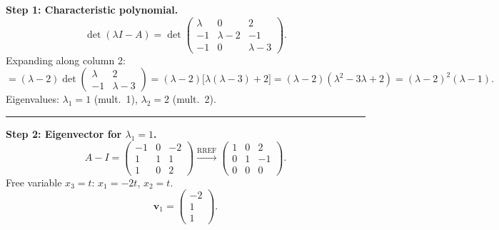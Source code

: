 \documentclass[12pt,a3paper]{article}
\begin{document}
\begin{tcolorbox}[enhanced,breakable,
  colback=cE!4,colframe=cE,boxrule=0.8pt,arc=5pt,
  title={\textbf{Answer --- Eigenvalues, Eigenvectors \& Diagonalization of
    $A=\begin{pmatrix}0&0&-2\\1&2&1\\1&0&3\end{pmatrix}$}},
  fonttitle=\bfseries\color{white},colbacktitle=cE]

\textbf{Step 1: Characteristic polynomial.}
\[
  \det(\lambda I - A)
  = \det\begin{pmatrix}\lambda&0&2\\-1&\lambda-2&-1\\-1&0&\lambda-3\end{pmatrix}.
\]
Expanding along column 2:
\[
  = (\lambda-2)\det\begin{pmatrix}\lambda&2\\-1&\lambda-3\end{pmatrix}
  = (\lambda-2)\bigl[\lambda(\lambda-3)+2\bigr]
  = (\lambda-2)(\lambda^2-3\lambda+2)
  = (\lambda-2)^2(\lambda-1).
\]
Eigenvalues: $\lambda_1 = 1$ (mult.\ 1),\; $\lambda_2 = 2$ (mult.\ 2).

\medskip\textcolor{cE}{\rule{\textwidth}{0.4pt}}

\textbf{Step 2: Eigenvector for $\lambda_1 = 1$.}
\[
  A - I = \begin{pmatrix}-1&0&-2\\1&1&1\\1&0&2\end{pmatrix}
  \xrightarrow{\text{RREF}}
  \begin{pmatrix}1&0&2\\0&1&-1\\0&0&0\end{pmatrix}.
\]
Free variable $x_3 = t$: $x_1 = -2t$, $x_2 = t$.
\[
  \mathbf{v}_1 = \begin{pmatrix}-2\\1\\1\end{pmatrix}.
\]


\end{tcolorbox}
\end{document}
